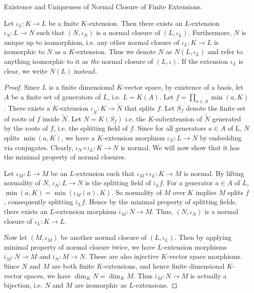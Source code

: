 \documentclass[../book.tex]{subfiles}
\begin{document}
\begin{thm} Existence and Uniqueness of Normal Closure of Finite Extensions.
    
    Let $\iota_L : K \to L$ be a finite $K$-extension. 
    Then there exists an $L$-extension $\iota_N : L \to N$ such that
    $(N,\iota_N)$ is a normal closure of $(L,\iota_L)$.
    Furthermore, $N$ is unique up to isomorphism, i.e.
    any other normal closure of $\iota_L : K \to L$ is
    isomorphic to $N$ as a $K$-extension. 
    Thus we denote $N$ as $N(L,\iota_L)$ and refer to anything isomorphic to it 
    as \emph{the} normal closure of $(L,\iota)$.
    If the extension $\iota_L$ is clear, we write $N(L)$ instead. 
\end{thm}
\begin{proof}
    Since $L$ is a finite dimensional $K$-vector space,
    by existence of a basis,
    let $A$ be a finite set of generators of $L$, i.e. $L = K(A)$.
    Let $f = \prod_{a \in A} \min(a,K)$. 
    There exists a $K$-extension $\iota_{\tilde{N}} : K \to \tilde{N}$ 
    that splits $f$. 
    Let $S_f$ denote the finite set of roots of $f$ inside $\tilde{N}$.
    Let $N = K(S_f)$ i.e. the $K$-subextension of $\tilde{N}$ generated 
    by the roots of $f$, i.e. the splitting field of $f$. 
    Since for all generators $a \in A$ of L, $N$ splits $\min(a,K)$,
    we have a $K$-extension morphism $\iota_N : L \to N$ by embedding via conjugates.
    Clearly, $\iota_N\circ\iota_L : K \to N$ is normal. 
    We will now show that it has the minimal property of normal closures. 
    
    Let $\iota_M : L \to M$ be an $L$-extension such that 
    $\iota_M\circ\iota_L : K \to M$ is normal. 
    By lifting normality of $N$, 
    $\iota_N : L \to N$ is the splitting field of $\bar\iota_L f$. 
    For a generator $a\in A$ of $L$, $\min(a,K) = \min(\iota_M(a),K)$. 
    So normality of $M$ over $K$ implies $M$ splits $f$,
    consequently splitting $\bar\iota_L f$. 
    Hence by the minimal property of splitting fields,
    there exists an $L$-extension morphism $\bar\iota_M : N \to M$.
    Thus, $(N,\iota_N)$ is a normal closure of $\iota_L : K \to L$.
    
    Now let $(M,\iota_M)$ be another normal closure of $(L,\iota_L)$. 
    Then by applying minimal property of normal closure twice,
    we have $L$-extension morphisms $\bar\iota_M : N \to M$ 
    and $\bar\iota_N : M \to N$.
    These are also injective $K$-vector space morphisms.
    Since $N$ and $M$ are both finite $K$-extensions,
    and hence finite dimensional $K$-vector spaces, 
    we have $\dim_K N = \dim_K M$.
    Thus $\bar\iota_M : N \to M$ is actually a bijection,
    i.e. $N$ and $M$ are isomorphic as $L$-extensions. 
\end{proof}
\end{document}
